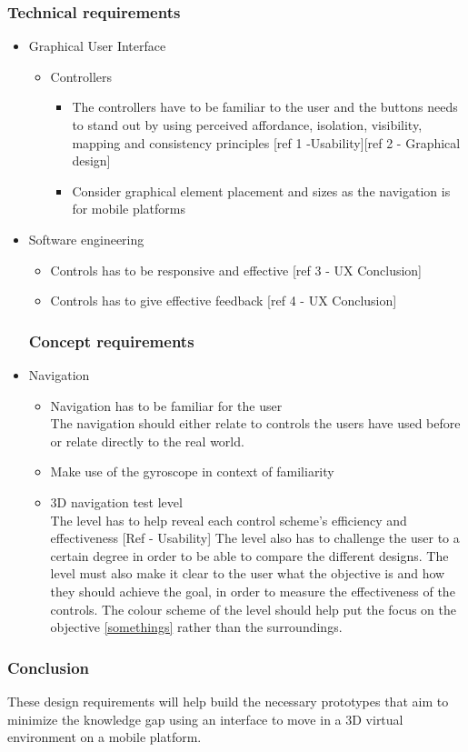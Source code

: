 \subsubsection{Technical requirements}
\begin{itemize}
	\item Graphical User Interface
		\begin{itemize}
		\item Controllers
			\begin{itemize}
				\item The controllers have to be familiar to the user and the buttons needs to stand out by using perceived affordance, isolation, visibility, mapping and consistency principles [ref 1 -Usability][ref 2 - Graphical design]
				\item Consider graphical element placement and sizes as the navigation is for mobile platforms
			\end{itemize}
		\end{itemize}
	\item Software engineering
		\begin{itemize}
			\item Controls has to be responsive and effective [ref 3 - UX Conclusion]
			\item Controls has to give effective feedback [ref 4 - UX Conclusion]
		\end{itemize}	
\subsubsection{Concept requirements}
	\item Navigation
		\begin{itemize}
		 	\item Navigation has to be familiar for the user \\
The navigation should either relate to controls the users have used before or relate directly to the real world.	
		 	\item Make use of the gyroscope in context of familiarity
		 	\item 3D navigation test level\\
The level has to help reveal each control scheme's efficiency and effectiveness [Ref - Usability]
The level also has to challenge the user to a certain 	degree in order to be able to compare the different designs. The level must also make it clear to the user what the objective is and how they should achieve the goal, in order to measure the effectiveness of the 	controls. The colour scheme of the level should help put the focus on the objective \ref {somethings} rather than the surroundings.
				\end{itemize}
\end{itemize}
\subsubsection{Conclusion}
These design requirements will help build the necessary prototypes that aim to minimize the knowledge gap using an interface to move in a 3D virtual environment on a mobile platform.

